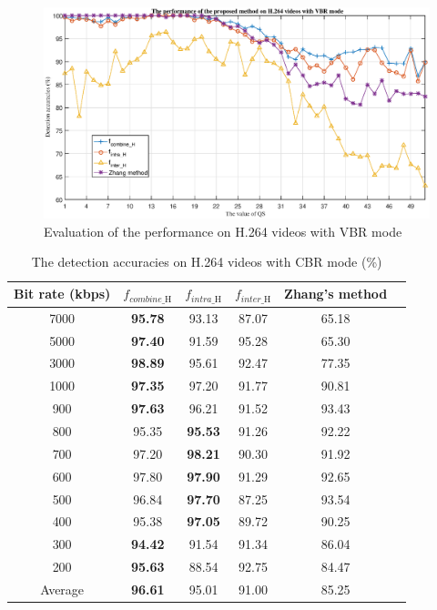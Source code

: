 \documentclass[journal,sort]{IEEEtran}
\begin{document}
\begin{figure}[htbp!]
	\centering
	\includegraphics[width=1\textwidth]{H264-VBR.eps}
	\caption{Evaluation of the performance on H.264 videos with VBR mode}
	\label{h264-vbr}
\end{figure}

\begin{table}
	\centering
	\caption{\label{tab:rate}The detection accuracies on H.264 videos with CBR mode (\%)}
	\begin{tabular}{cccccc}
		\toprule
		Bit rate (kbps)& $f_{combine\_\text{H}}$ & $f_{intra\_\text{H}}$ & $f_{inter\_\text{H}}$ & Zhang's method\\\midrule
		7000 & \textbf{95.78}     &93.13     & 87.07    &65.18 \\
		5000 & \textbf{97.40}     &91.59     & 95.28    &65.30 \\
		3000 & \textbf{98.89}     &95.61     & 92.47   &77.35 \\\midrule
		1000 & \textbf{97.35}      &97.20     & 91.77   &90.81 \\
		900 & \textbf{97.63}     &96.21     & 91.52    &93.43 \\
		800 & 95.35     &\textbf{95.53}     & 91.26    &92.22 \\
		700 & 97.20     &\textbf{98.21}     & 90.30    &91.92 \\
		600 & 97.80     &\textbf{97.90}     & 91.29    &92.65 \\
		500 & 96.84    &\textbf{97.70}     &  87.25    &93.54 \\
		400 & 95.38     &\textbf{97.05}     & 89.72    &90.25 \\\midrule
		300 & \textbf{94.42}     &91.54    &  91.34   &86.04 \\
		200 & \textbf{95.63}     &88.54     & 92.75   &84.47 \\\midrule
		Average & \textbf{96.61}   & 95.01   &  91.00 & 85.25 \\\bottomrule
	\end{tabular}
\end{table}
\end{document}

